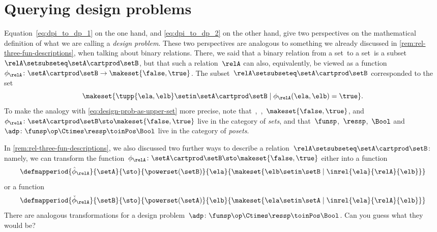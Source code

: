
\section{Querying design problems}
\label{sec:dp-querying}



Equation~\cref{eq:dpi_to_dp_1} on the one hand, and \cref{eq:dpi_to_dp_2} on the other hand, give two perspectives on the mathematical definition of what we are calling a \emph{design problem}.
These two perspectives are analogous to something we already discussed in \cref{rem:rel-three-fun-descriptions}, when talking about binary relations.
There, we said that a binary relation from a set~\setA to a set~\setB is a subset~$\relA \setsubseteq \setA \cartprod \setB$,
but that such a relation~$\relA$ can also, equivalently, be viewed as a function~$\phi_{\relA}\colon \setA \cartprod\setB \to \makeset{ \false, \true }$.
The subset~$\relA \setsubseteq \setA \cartprod \setB$ corresponded to the set
\begin{equation}
    \makeset{ \tupp{\ela, \elb} \setin \setA \cartprod \setB \mid \phi_{\relA}(\ela, \elb) = \true }.
\end{equation}
%
To make the analogy with \cref{eq:design-prob-as-upper-set} more precise, note that~\setA,~\setB,~$\makeset{ \false, \true }$, and~$\phi_{\relA}\colon \setA \cartprod\setB \sto \makeset{ \false, \true }$ live in the category of \emph{sets}, and that~$\funsp$,~$\ressp$,~$\Bool$ and~$\adp\colon \funsp\op \Ctimes \ressp\toinPos \Bool$ live in the category of \emph{posets}.

In \cref{rem:rel-three-fun-descriptions}, we also discussed two further ways to describe a relation~$\relA \setsubseteq \setA \cartprod \setB$: namely, we can transform the function~$\phi_{\relA}\colon \setA \cartprod\setB \sto \makeset{ \false, \true }$ either into a function
\begin{equation}
    \label{eq:curried-relation-again}
    \defmapperiod{
        \hat \phi_{\relA}}{\setA}{\sto
    }{
        \powerset(\setB)
    }{
        \ela
    }{
        \makeset{ \elb \setin \setB \mid \inrel{\ela
            }{
                \relA
            }{
                \elb} }
    }
\end{equation}
or a function
\begin{equation}
    \label{eq:co-curried-relation-again}
    \defmapperiod{
        \check \phi_{\relA}}{\setB}{\sto
    }{
        \powerset (\setA)
    }{
        \elb
    }{
        \makeset{ \ela \setin \setA \mid \inrel{\ela
            }{
                \relA
            }{
                \elb}}
    }
\end{equation}
%
There are analogous transformations for a design problem~$\adp\colon \funsp\op \Ctimes \ressp\toinPos \Bool$.
Can you guess what they would be?

